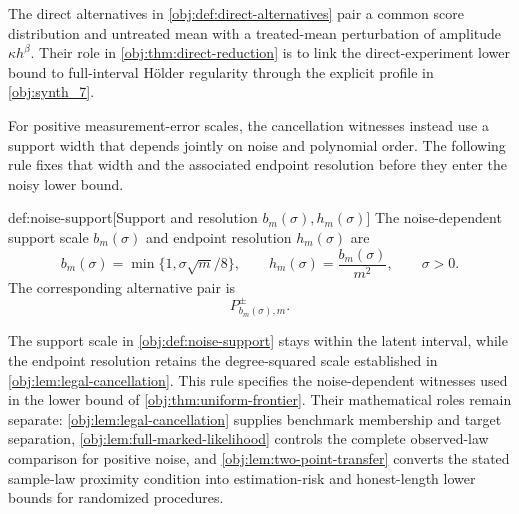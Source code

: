 The direct alternatives  in \cref{obj:def:direct-alternatives} pair a common score distribution and untreated mean with a treated-mean perturbation of amplitude \(\kappa h^\beta\). Their role in \cref{obj:thm:direct-reduction} is to link the direct-experiment lower bound to full-interval Hölder regularity through the explicit profile in \cref{obj:synth_7}.

For positive measurement-error scales, the cancellation witnesses instead use a support width that depends jointly on noise and polynomial order. The following rule fixes that width and the associated endpoint resolution before they enter the noisy lower bound.

\begin{definitionv}{def:noise-support}[Support and resolution \(b_m(\sigma),h_m(\sigma)\)]
The noise-dependent support scale \(b_m(\sigma)\) and endpoint resolution \(h_m(\sigma)\) are
\[
b_m(\sigma)=\min\{1,\sigma\sqrt m/8\},
\qquad
h_m(\sigma)=\frac{b_m(\sigma)}{m^2},
\qquad \sigma>0.
\]
The corresponding alternative pair is
\[
P^\pm_{b_m(\sigma),m}.
\]
\end{definitionv}

The support scale  in \cref{obj:def:noise-support} stays within the latent interval, while the endpoint resolution  retains the degree-squared scale established in \cref{obj:lem:legal-cancellation}. This rule specifies the noise-dependent witnesses used in the lower bound of \cref{obj:thm:uniform-frontier}. Their mathematical roles remain separate: \cref{obj:lem:legal-cancellation} supplies benchmark membership and target separation, \cref{obj:lem:full-marked-likelihood} controls the complete observed-law comparison for positive noise, and \cref{obj:lem:two-point-transfer} converts the stated sample-law proximity condition into estimation-risk and honest-length lower bounds for randomized procedures.
